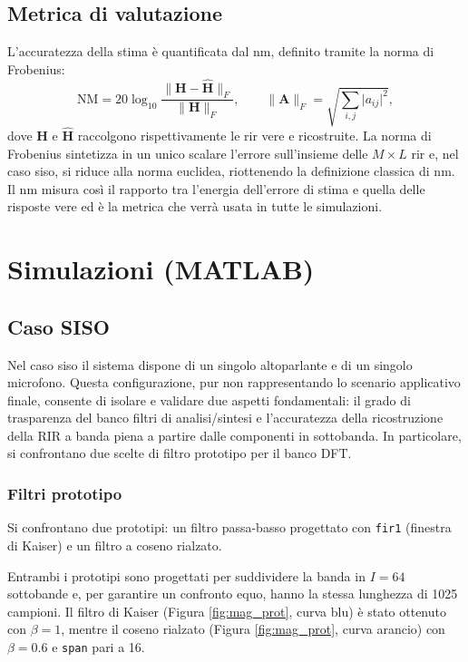 \documentclass[11pt,a4paper]{article}
\begin{document}
	\subsection{Metrica di valutazione}\label{ssec:nm_metric}
	L'accuratezza della stima è quantificata dal \ac{nm}, definito tramite la norma di Frobenius:
	\begin{equation}
		\mathrm{NM} = 20\log_{10} \frac{\lVert\mathbf{H}-\hat{\mathbf{H}}\rVert_F}{\lVert\mathbf{H}\rVert_F},
		\qquad
		\lVert\mathbf{A}\rVert_F=\sqrt{\sum_{i,j} \lvert a_{ij}\rvert^2},
		\label{eq:nm}
	\end{equation}
	dove $\mathbf{H}$ e $\hat{\mathbf{H}}$ raccolgono rispettivamente le \ac{rir} vere e ricostruite.
	La norma di Frobenius sintetizza in un unico scalare l'errore sull'insieme delle  $M \times L$ \ac{rir} e, nel caso \ac{siso}, si riduce alla norma euclidea, riottenendo la definizione classica di \ac{nm}.
	Il \ac{nm} misura così il rapporto tra l'energia dell'errore di stima e quella delle risposte vere ed è la metrica che verrà usata in tutte le simulazioni.
	
	\newpage
	\section{Simulazioni (MATLAB)}

	\subsection{Caso SISO}
	Nel caso \ac{siso} il sistema dispone di un singolo altoparlante e di un singolo microfono.
	Questa configurazione, pur non rappresentando lo scenario applicativo finale, consente di isolare e validare due aspetti fondamentali: il grado di  trasparenza del banco filtri di analisi/sintesi e l'accuratezza della ricostruzione della RIR a banda piena a partire dalle componenti in sottobanda.
	In particolare, si confrontano due scelte di filtro prototipo per il banco DFT.
	
	\subsubsection{Filtri prototipo}
	Si confrontano due prototipi: un filtro passa-basso progettato con \texttt{fir1} (finestra di Kaiser) e un filtro a coseno rialzato.
	
	Entrambi i prototipi sono progettati per suddividere la banda in $I=64$ sottobande e, per garantire un confronto equo, hanno la stessa lunghezza di 1025 campioni.
	Il filtro di Kaiser (Figura \ref{fig:mag_prot}, curva blu) è stato ottenuto con $\beta=1$, mentre il coseno rialzato (Figura \ref{fig:mag_prot}, curva arancio) con $\beta=0.6$ e \texttt{span} pari a 16.
	
\end{document}
